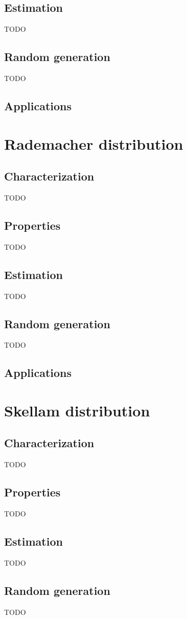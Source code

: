 \subsection{Estimation}
TODO
\subsection{Random generation}
TODO
\subsection{Applications}

\section{Rademacher distribution}
\subsection{Characterization}
TODO
\subsection{Properties}
TODO
\subsection{Estimation}
TODO
\subsection{Random generation}
TODO
\subsection{Applications}

\section{Skellam distribution}
\subsection{Characterization}
TODO
\subsection{Properties}
TODO
\subsection{Estimation}
TODO
\subsection{Random generation}
TODO
